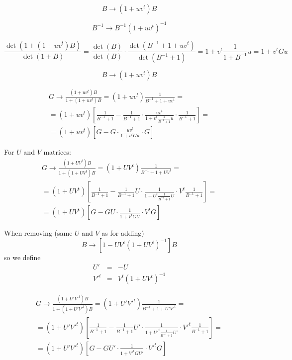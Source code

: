 \documentclass[onecolumn,english,prl,showpacs]{revtex4}
\begin{document}
\begin{equation}
 B \rightarrow (1+uv^t)B
\end{equation}

\begin{equation}
 B^{-1} \rightarrow B^{-1}(1+uv^t)^{-1}
\end{equation}

\begin{equation}
 \frac{\det(1+(1+uv^t)B)}{\det(1+B)} = \frac{\det(B)}{\det(B)}\cdot \frac{\det(B^{-1}+1+uv^t)}{\det(B^{-1}+1)} = 1+v^t\frac{1}{1+B^{-1}} u = 1+v^t G u
\end{equation}

\begin{equation}
 B \rightarrow (1+uv^t)B
\end{equation}

\begin{multline}
 G \rightarrow \frac{(1+uv^t)B}{1+(1+uv^t)B} = (1+uv^t)\frac{1}{B^{-1}+1+uv^t} =\\= (1+uv^t)\left[\frac{1}{B^{-1}+1}-\frac{1}{B^{-1}+1}\cdot\frac{uv^t}{1+v^t\frac{1}{B^{-1}+1}u}\cdot\frac{1}{B^{-1}+1}\right]=\\= (1+uv^t)\left[G-G\cdot\frac{uv^t}{1+v^tGu}\cdot G\right]
\end{multline}

For $U$ and $V$ matrices:
\begin{multline}
 G \rightarrow \frac{(1+UV^t)B}{1+(1+UV^t)B} = (1+UV^t)\frac{1}{B^{-1}+1+UV^t} =\\= (1+UV^t)\left[\frac{1}{B^{-1}+1}-\frac{1}{B^{-1}+1}U\cdot\frac{1}{1+U^t\frac{1}{B^{-1}+1}U}\cdot V^t\frac{1}{B^{-1}+1}\right]=\\= (1+UV^t)\left[G-GU\cdot\frac{1}{1+V^tGU}\cdot V^tG\right]
\end{multline}

When removing (same $U$ and $V$ as for adding)
\begin{equation}
 B \rightarrow [1-UV^t(1+UV^t)^{-1}]B
\end{equation}
so we define
\begin{eqnarray}
 U' &=& -U\\
 V'^t &=& V^t(1+UV^t)^{-1}
\end{eqnarray}

\begin{multline}
 G \rightarrow \frac{(1+U'V'^t)B}{1+(1+U'V'^t)B} = (1+U'V'^t)\frac{1}{B^{-1}+1+U'V'^t} =\\= (1+U'V'^t)\left[\frac{1}{B^{-1}+1}-\frac{1}{B^{-1}+1}U'\cdot\frac{1}{1+U'^t\frac{1}{B^{-1}+1}U'}\cdot V'^t\frac{1}{B^{-1}+1}\right]=\\= (1+U'V'^t)\left[G-GU'\cdot\frac{1}{1+V'^tGU'}\cdot V'^tG\right]
\end{multline}
\end{document}
